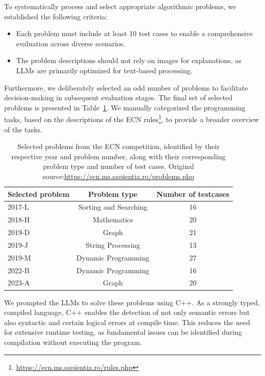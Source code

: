 To systematically process and select appropriate algorithmic problems, we established the following criteria:
\begin{itemize}
	\item Each problem must include at least 10 test cases to enable a comprehensive evaluation across diverse scenarios.
	\item The problem descriptions should not rely on images for explanations, as LLMs are primarily optimized for text-based processing.
\end{itemize}

Furthermore, we deliberately selected an odd number of problems to facilitate decision-making in subsequent evaluation stages.
The final set of selected problems is presented in Table~\ref{th4:table:selected_problems}.
We manually categorized the programming tasks, based on the descriptions of the ECN rules\footnote{\url{https://ecn.ms.sapientia.ro/rules.php}}, to provide a broader overview of the tasks. 

\begin{table}[h]
	\centering
	\begin{tabular}{|l|c|c|}
		\hline
		\textbf{Selected problem} & \textbf{Problem type}  & \textbf{Number of testcases} \\ \hline
		2017-L                    &  Sorting and Searching & 16 \\ \hline
		2018-H                    &  Mathematics           & 20 \\ \hline
		2019-D                    &  Graph                 & 21 \\ \hline
		2019-J                    &  String Processing     & 13 \\ \hline
		2019-M                    &  Dynamic Programming   & 27 \\ \hline
		2022-B                    &  Dynamic Programming   & 16 \\ \hline
		2023-A                    &  Graph                 & 20 \\ \hline 
	\end{tabular}
	\caption{Selected problems from the ECN competition, identified by their respective year and problem number, along with their corresponding problem type and number of test cases. Original source:\url{https://ecn.ms.sapientia.ro/problems.php}}
	\label{th4:table:selected_problems}
\end{table}
We prompted the LLMs to solve these problems using C++.
As a strongly typed, compiled language, C++ enables the detection of not only semantic errors but also syntactic and certain logical errors at compile time.
This reduces the need for extensive runtime testing, as fundamental issues can be identified during compilation without executing the program.


